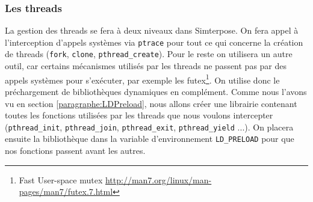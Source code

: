 \subsubsection{Les threads}

La gestion des threads se fera à deux niveaux dans Simterpose. On fera appel à l'interception d'appels systèmes via \texttt{ptrace} pour tout ce qui concerne la création de threads (\texttt{fork}, \texttt{clone}, \texttt{pthread\_create}). Pour le reste on utilisera un autre outil, car certains mécanismes utilisés par les threads ne passent pas par des appels systèmes pour s'exécuter, par exemple les futex\footnote{Fast User-space mutex \url{http://man7.org/linux/man-pages/man7/futex.7.html}}. On utilise donc le préchargement de bibliothèques dynamiques en complément. Comme nous l'avons vu en section \ref{paragraphe:LDPreload}, nous allons créer une librairie contenant toutes les fonctions utilisées par les threads que nous voulons intercepter (\texttt{pthread\_init}, \texttt{pthread\_join}, \texttt{pthread\_exit}, \texttt{pthread\_yield} ...). On placera ensuite la bibliothèque dans la variable d'environnement \texttt{LD\_PRELOAD} pour que nos fonctions passent avant les autres.


